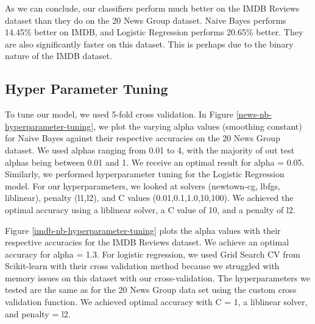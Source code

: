 \documentclass[11pt]{homework}
\begin{document}
As we can conclude, our classifiers perform much better on the IMDB Reviews dataset than they do on the 20 News Group dataset. Naive Bayes performs 14.45\% better on IMDB, and Logistic Regression performs 20.65\% better. They are also significantly faster on this dataset. This is perhaps due to the binary nature of the IMDB dataset. 

\subsection{Hyper Parameter Tuning}
To tune our model, we used 5-fold cross validation. In Figure \ref{news-nb-hyperparameter-tuning}, we plot the varying alpha values (smoothing constant) for Naive Bayes against their respective accuracies on the 20 News Group dataset. We used alphas ranging from 0.01 to 4, with the majority of out test alphas being between 0.01 and 1. We receive an optimal result for alpha = 0.05. Similarly, we performed hyperparameter tuning for the Logistic Regression model. For our hyperparameters, we looked at solvers (newtown-cg, lbfgs, liblinear), penalty (l1,l2), and C values (0.01,0.1,1.0,10,100). We achieved the optimal accuracy using a liblinear solver, a C value of 10, and a penalty of l2. 

Figure \ref{imdb-nb-hyperparameter-tuning} plots the alpha values with their respective accuracies for the IMDB Reviews dataset. We achieve an optimal accuracy for alpha = 1.3. For logistic regression, we used Grid Search CV from Scikit-learn with their cross validation method because we struggled with memory issues on this dataset with our cross-validation. The hyperparameters we tested are the same as for the 20 News Group data set using the custom cross validation function. We achieved optimal accuracy with C = 1, a liblinear solver, and penalty = l2.
\end{document}
